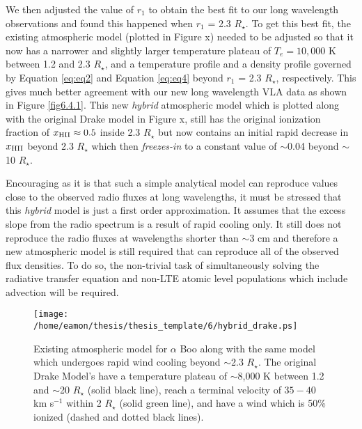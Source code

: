 We then adjusted the value of $r_{1}$ to obtain the best fit to our long wavelength observations and found this happened when $r_{1}$ = 2.3 $R_{\star}$. To get this best fit, the existing atmospheric model (plotted in Figure x) needed to be adjusted so that it now has a narrower and slightly larger temperature plateau of $T_e = 10,000$ K between 1.2 and 2.3 $R_{\star}$, and a temperature profile and a density profile governed by Equation \ref{eq:eq2} and Equation \ref{eq:eq4} beyond $r_{1}$ = 2.3 $R_{\star}$, respectively. This gives much better agreement with our new long wavelength VLA data as shown in Figure \ref{fig6.4.1}. This new \textit{hybrid} atmospheric model which is plotted along with the original Drake model in Figure x, still has the original ionization fraction of $x_{\rm{HII}} \approx 0.5$ inside 2.3 $R_{\star}$ but now contains an initial rapid decrease in $x_{\rm{HII}}$ beyond 2.3 $R_{\star}$ which then \textit{freezes-in} to a constant value of $\sim$0.04 beyond $\sim$10 $R_{\star}$.

Encouraging as it is that such a simple analytical model can reproduce values close to the observed radio fluxes at long wavelengths, it must be stressed that this \textit{hybrid} model is just a first order approximation. It assumes that the excess slope from the radio spectrum is a result of rapid cooling only. It still does not reproduce the radio fluxes at wavelengths shorter than $\sim$3 cm and therefore a new atmospheric model is still required that can reproduce all of the observed flux densities. To do so, the non-trivial task of simultaneously solving the radiative transfer equation and non-LTE atomic level populations which include advection will be required.

\begin{figure}[hbt!]
\centering 
          \texttt{[image: /home/eamon/thesis/thesis\_template/6/hybrid\_drake.ps]}
\caption[Hybrid Drake model which undergoes rapid wind cooling beyond $\sim$2.3 $R_{\star}$.]{Existing atmospheric model for $\alpha$ Boo \cite[`model A']{drake_1985} along with the same model which undergoes rapid wind cooling beyond $\sim$2.3 $R_{\star}$. The original Drake Model's have a temperature plateau of $\sim$8,000 K between 1.2 and $\sim$20 $R_{\star}$ (solid black line), reach a terminal velocity of $35-40$ km s$^{-1}$ within 2 $R_{\star}$ (solid green line), and have a wind which is 50\% ionized (dashed and dotted black lines).}
\label{fig6.9.3}
\end{figure}

